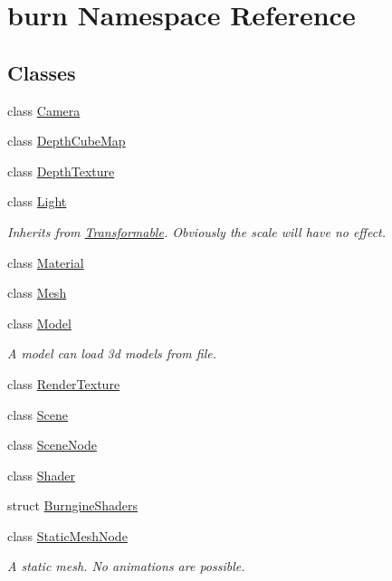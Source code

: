\hypertarget{namespaceburn}{\section{burn Namespace Reference}
\label{namespaceburn}
}
\subsection*{Classes}
\begin{DoxyCompactItemize}
\item 
class \hyperlink{classburn_1_1_camera}{Camera}
\item 
class \hyperlink{classburn_1_1_depth_cube_map}{Depth\-Cube\-Map}
\item 
class \hyperlink{classburn_1_1_depth_texture}{Depth\-Texture}
\item 
class \hyperlink{classburn_1_1_light}{Light}
\begin{DoxyCompactList}\small\item\em Inherits from \hyperlink{classburn_1_1_transformable}{Transformable}. Obviously the scale will have no effect. \end{DoxyCompactList}\item 
class \hyperlink{classburn_1_1_material}{Material}
\item 
class \hyperlink{classburn_1_1_mesh}{Mesh}
\item 
class \hyperlink{classburn_1_1_model}{Model}
\begin{DoxyCompactList}\small\item\em A model can load 3d models from file. \end{DoxyCompactList}\item 
class \hyperlink{classburn_1_1_render_texture}{Render\-Texture}
\item 
class \hyperlink{classburn_1_1_scene}{Scene}
\item 
class \hyperlink{classburn_1_1_scene_node}{Scene\-Node}
\item 
class \hyperlink{classburn_1_1_shader}{Shader}
\item 
struct \hyperlink{structburn_1_1_burngine_shaders}{Burngine\-Shaders}
\item 
class \hyperlink{classburn_1_1_static_mesh_node}{Static\-Mesh\-Node}
\begin{DoxyCompactList}\small\item\em A static mesh. No animations are possible. \end{DoxyCompactList}\item 

\end{DoxyCompactItemize}

